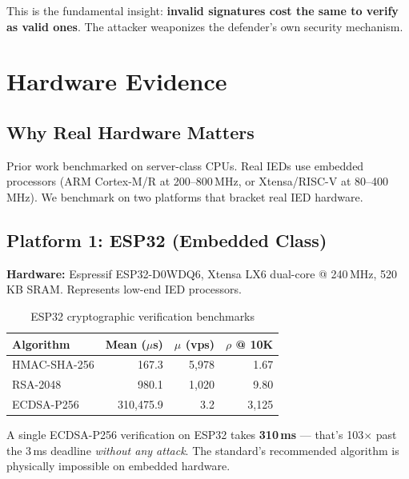 \documentclass[11pt,a4paper,twocolumn]{article}
\begin{document}
\begin{keyinsight}
This is the fundamental insight: \textbf{invalid signatures cost the same to verify as valid ones}. The attacker weaponizes the defender's own security mechanism.
\end{keyinsight}

\section{Hardware Evidence}
\label{sec:hardware}

\subsection{Why Real Hardware Matters}

Prior work \cite{kit2020auth, iec62351perf} benchmarked on server-class CPUs. Real IEDs use embedded processors (ARM Cortex-M/R at 200--800\,MHz, or Xtensa/RISC-V at 80--400\,MHz). We benchmark on two platforms that bracket real IED hardware.

\subsection{Platform 1: ESP32 (Embedded Class)}

\textbf{Hardware:} Espressif ESP32-D0WDQ6, Xtensa LX6 dual-core @ 240\,MHz, 520\,KB SRAM. Represents low-end IED processors.

\begin{table}[H]
\centering
\caption{ESP32 cryptographic verification benchmarks}
\label{tab:esp32}
\scriptsize
\begin{tabular}{@{}lrrr@{}}
\toprule
\textbf{Algorithm} & \textbf{Mean ($\mu$s)} & \textbf{$\mu$ (vps)} & \textbf{$\rho$ @ 10K} \\
\midrule
HMAC-SHA-256 & 167.3 & 5{,}978 & 1.67 \\
RSA-2048 & 980.1 & 1{,}020 & 9.80 \\
ECDSA-P256 & 310{,}475.9 & 3.2 & 3{,}125 \\
\bottomrule
\end{tabular}
\end{table}

\begin{attackbox}
A single ECDSA-P256 verification on ESP32 takes \textbf{310\,ms} --- that's 103$\times$ past the 3\,ms deadline \emph{without any attack}. The standard's recommended algorithm is physically impossible on embedded hardware.
\end{attackbox}
\end{document}
